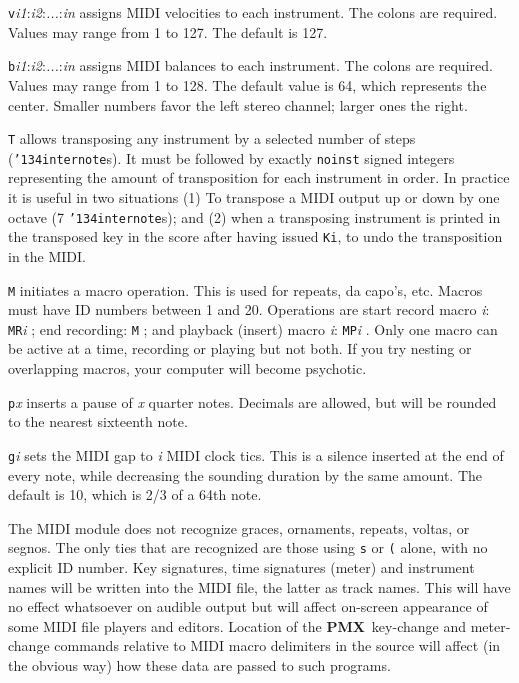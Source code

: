\documentclass[11pt]{article}
\def\bs{{\tt\char'134}}
\newcommand\PMXX{\textbf{PMX}}
\newcommand\PMX{\PMXX~}
\def\newfrom{2.59}  %
\def\NEW#1{\ifdim#1 pt<\newfrom pt\else%
\marginpar{\fbox{#1}}\fi}
\begin{document}
{\tt v}{\it i1}:{\it i2}:{\it...}:{\it in} assigns MIDI \NEW{2.3} velocities 
to each instrument.  The colons are required.  Values may range from 1 to 127. 
The default is 127.  

{\tt b}{\it i1}:{\it i2}:{\it...}:{\it in} assigns MIDI \NEW{2.3} balances to 
each instrument.  The colons are required.  Values may range from 1 to 128. 
The default value is 64, which represents the center.  Smaller numbers favor 
the left stereo channel; larger ones the right.

{\tt T} allows transposing any instrument by a selected number of steps \NEW{2.7}
 ({\tt\bs internote}s). 
It must be followed by exactly {\tt noinst} signed integers representing the
amount of transposition for each instrument in order. In practice it is useful 
in two situations (1) To transpose a MIDI output up or down by one octave 
(7 {\tt\bs internote}s); and (2) when a transposing instrument is printed 
in the transposed key in the score after having issued {\tt Ki}, to undo 
the transposition in the MIDI.

{\tt M} initiates a macro operation.  This is used for repeats, da capo's, etc.  
Macros must have ID numbers between 1 and 20.  Operations are start record
macro {\it i}:  {\tt MR}{\it i} ; end recording: {\tt M} ; and playback (insert)
macro {\it i}: {\tt MP}{\it i} .  Only one macro can be active at a time, 
recording or playing but not both.  If you try nesting or overlapping macros, 
your computer will become psychotic.

{\tt p}{\it x} inserts a pause of {\it x} quarter notes.  Decimals are 
allowed, but will be rounded to the nearest sixteenth note.

{\tt g}{\it i} sets the MIDI gap to {\it i} MIDI clock tics.  This is a silence 
inserted at the end of every note, while decreasing the sounding duration 
by the same amount.  The default is 10, which is 2/3 of a 64th note.

      The MIDI module does not recognize graces, ornaments, repeats, voltas, or 
segnos.  The only ties that are recognized are those using {\tt s} or {\tt (} 
alone, with no explicit ID number.  Key signatures,
time signatures (meter) and instrument names will be written into the MIDI file, 
the latter as track names.  This will have no effect whatsoever on audible 
output but will affect on-screen appearance of some MIDI file players 
and editors.  Location of the \PMX key-change and meter-change commands 
relative to MIDI macro delimiters in the source will affect (in the obvious
way) how these data are passed to such programs.
\end{document}
